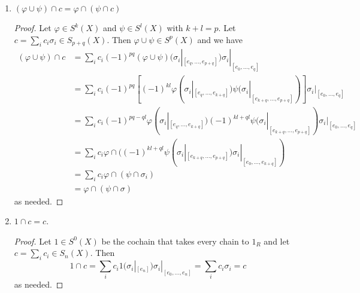 \documentclass[11pt]{article}
\begin{document}
\begin{enumerate}
\begin{enumerate}
\begin{proof}
\begin{align}
            &\hspace*{2pc}+\sum_i\sum_{j=q}^{p+q}c_i(-1)^p(-1)^j(-1)^{p(q-1)}\varphi(\sigma_i|_{[e_{q-1},\dots,\hat e_j,\dots,e_{p+q}]})\sigma_i|_{[e_0,\dots,e_{q-1}]}.
          \end{align}
          Collecting exponents and adding terms (2),(3), and (4) together we find that (2) and (4) almost cancel out, leaving (3) plus the term $\sum_ic_i(-1)^{pq}(-1)^{q}\varphi(\sigma_i|_{[e_q,\dots,e_{p+q}]})\sigma_i|_{[e_0,\dots,e_{q-1}]}$. But this sum is just the sum in (3) taken to $q$ instead of $q-1$; that is, what remains after the sum is taken is $\partial(\varphi\cap c) = \sum_i\sum_{j=0}^q c_i(-1)^{pq}(-1)^j\varphi(\sigma_i|_{[e_q,\dots,e_{p+q}]})\sigma_i|_{[e_0,\dots,\hat e_j,\dots,e_q]}$ as needed.
        \end{proof}
        \item $(\varphi\cup \psi)\cap c = \varphi\cap (\psi\cap c)$ \begin{proof}
          Let $\varphi\in S^k(X)$ and $\psi\in S^l(X)$ with $k+l = p$. Let $c = \sum_i c_i\sigma_i\in S_{p+q}(X)$. Then $\varphi\cup\psi\in S^p(X)$ and we have \begin{align*}
            (\varphi\cup\psi)\cap c &= \sum_i c_i (-1)^{pq}(\varphi\cup\psi)(\sigma_i|_{[e_q,\dots,e_{p+q}]})\sigma_i|_{[e_0,\dots,e_q]}\\
            &= \sum_i c_i (-1)^{pq}[(-1)^{kl}\varphi(\sigma_i|_{[e_q,\dots,e_{k+q}]})\psi(\sigma_i|_{[e_{k+q},\dots,e_{p+q}]})]\sigma_i|_{[e_0,\dots,e_q]}\\
            &= \sum_i c_i (-1)^{pq-ql}\varphi(\sigma_i|_{[e_q,\dots,e_{k+q}]})(-1)^{kl+ql}\psi(\sigma_i|_{[e_{k+q},\dots,e_{p+q}]})\sigma_i|_{[e_0,\dots,e_q]}\\
            &= \sum_i c_i \varphi\cap ((-1)^{kl+ql}\psi(\sigma_i|_{[e_{k+q},\dots,e_{p+q}]})\sigma_i|_{[e_0,\dots,e_{k+q}]})\\
            &= \sum_i c_i \varphi\cap (\psi\cap\sigma_i)\\
            &= \varphi\cap(\psi\cap\sigma)
          \end{align*} as needed.
        \end{proof}
        \item $1\cap c = c$.\begin{proof}
          Let $1\in S^0(X)$ be the cochain that takes every chain to $1_R$ and let $c = \sum_ic_i\in S_n(X)$. Then \[1\cap c = \sum_i c_i 1(\sigma_i|_{[e_n]})\sigma_i|_{[e_0,\dots,e_n]} = \sum_i c_i\sigma_i = c\] as needed.
        \end{proof}

\end{enumerate}
\end{enumerate}
\end{document}
